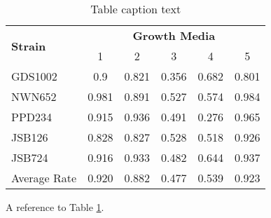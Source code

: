 \begin{table} %
\centering %
\begin{tabular}{l c c c c c} %
\toprule %
\multirow{2}{*}{\textbf{Strain}} & \multicolumn{5}{c}{\textbf{Growth Media}} \\
\cmidrule(l){2-6} %
& 1 & 2 & 3 & 4 & 5\\ %
\midrule %
GDS1002& 0.9 & 0.821 & 0.356 & 0.682 & 0.801\\ %
NWN652 & 0.981 & 0.891 & 0.527 & 0.574 & 0.984\\ %
PPD234 & 0.915 & 0.936 & 0.491 & 0.276 & 0.965\\ %
JSB126 & 0.828 & 0.827 & 0.528 & 0.518 & 0.926\\ %
JSB724 & 0.916 & 0.933 & 0.482 & 0.644 & 0.937\\ %
\midrule %
\midrule %
Average Rate & 0.920 & 0.882 & 0.477 & 0.539 & 0.923\\ %
\bottomrule %
\end{tabular}
\caption{Table caption text} %
\label{tab:template} %
\end{table}

A reference to Table \ref{tab:template}.

